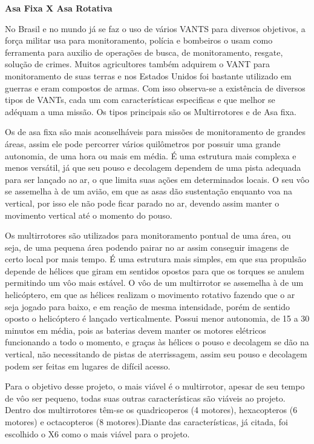 \textbf{Asa Fixa X Asa Rotativa}

No Brasil e no mundo já se faz o uso de vários VANTS para diversos objetivos, a força militar usa para monitoramento, polícia e bombeiros o usam como ferramenta para auxilio de operações de busca, de monitoramento, resgate, solução de crimes. Muitos agricultores também adquirem o VANT para monitoramento de suas terras e nos Estados Unidos foi bastante utilizado em guerras e eram compostos de armas. Com isso observa-se a existência de diversos tipos de VANTs, cada um com características especificas e que melhor se adéquam a uma missão. Os tipos principais são os Multirrotores e de Asa fixa. \cite{vantregras2013}

Os de asa fixa são mais aconselháveis para missões de monitoramento de grandes áreas, assim ele pode percorrer vários quilômetros por possuir uma grande autonomia, de uma hora ou mais em média. É uma estrutura mais complexa e menos versátil, já que seu pouso e decolagem dependem de uma pista adequada para ser lançado ao ar, o que limita suas ações em determinados locais. O seu vôo se assemelha à de um avião, em que as asas dão sustentação enquanto voa na vertical, por isso ele não pode ficar parado no ar, devendo assim manter o movimento vertical até o momento do pouso.

Os multirrotores são utilizados para monitoramento pontual de uma área, ou seja, de uma pequena área podendo pairar no ar assim conseguir imagens de certo local por mais tempo. É uma estrutura mais simples, em que sua propulsão depende de hélices que giram em sentidos opostos para que os torques se anulem permitindo um vôo mais estável. O vôo de um multirrotor se assemelha à de um helicóptero, em que as hélices realizam o movimento rotativo fazendo que o ar seja jogado para baixo, e em reação de mesma intensidade, porém de sentido oposto o helicóptero é lançado verticalmente. Possui menor autonomia, de 15 a 30 minutos em média, pois as baterias devem manter os motores elétricos funcionando a todo o momento, e graças às hélices o pouso e decolagem se dão na vertical, não necessitando de pistas de aterrissagem, assim seu pouso e decolagem podem ser feitas em lugares de difícil acesso. \cite{widmaier2005}

Para o objetivo desse projeto, o mais viável é o multirrotor, apesar de seu tempo de vôo ser pequeno, todas suas outras características são viáveis ao projeto. Dentro dos multirrotores têm-se os quadricoperos (4 motores), hexacopteros (6 motores) e octacopteros (8 motores).Diante das características, já citada, foi escolhido o X6 como o mais viável para o projeto.
